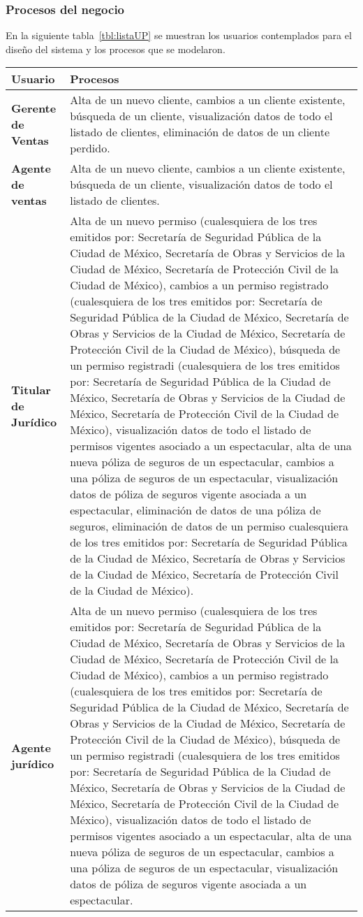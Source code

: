 \subsubsection{Procesos del negocio}
En la siguiente tabla~\ref{tbl:listaUP} se muestran los usuarios contemplados para el diseño del sistema y los procesos que se modelaron.
\begin{longtable}[H]{m{4cm}m{8cm}}
    \toprule
    \centering \textbf{Usuario} & \centering  \textbf{Procesos} \tabularnewline
    \midrule
    \textbf{Gerente de Ventas} & Alta de un nuevo cliente, cambios a un cliente existente, búsqueda de un cliente, visualización datos de todo el listado de clientes, eliminación de datos de un cliente perdido.\tabularnewline
    \textbf{Agente de ventas} & Alta de un nuevo cliente, cambios a un cliente existente, búsqueda de un cliente, visualización datos de todo el listado de clientes.\tabularnewline
    \textbf{Titular de Jurídico} & Alta de un nuevo permiso (cualesquiera de los tres emitidos por: Secretaría de Seguridad Pública de la Ciudad de México, Secretaría de Obras y Servicios de la Ciudad de México, Secretaría de Protección Civil de la Ciudad de México), cambios a un permiso registrado (cualesquiera de los tres emitidos por: Secretaría de Seguridad Pública de la Ciudad de México, Secretaría de Obras y Servicios de la Ciudad de México, Secretaría de Protección Civil de la Ciudad de México), búsqueda de un permiso registradi (cualesquiera de los tres emitidos por: Secretaría de Seguridad Pública de la Ciudad de México, Secretaría de Obras y Servicios de la Ciudad de México, Secretaría de Protección Civil de la Ciudad de México), visualización datos de todo el listado de permisos vigentes asociado a un espectacular, alta de una nueva póliza de seguros de un espectacular, cambios  a una póliza de seguros de un espectacular,  visualización datos de póliza de seguros vigente asociada a un espectacular, eliminación de datos de una póliza de seguros, eliminación de datos de un permiso cualesquiera de los tres emitidos por: Secretaría de Seguridad Pública de la Ciudad de México, Secretaría de Obras y Servicios de la Ciudad de México, Secretaría de Protección Civil de la Ciudad de México).\tabularnewline
    \textbf{Agente jurídico} & Alta de un nuevo permiso (cualesquiera de los tres emitidos por: Secretaría de Seguridad Pública de la Ciudad de México, Secretaría de Obras y Servicios de la Ciudad de México, Secretaría de Protección Civil de la Ciudad de México), cambios a un permiso registrado (cualesquiera de los tres emitidos por: Secretaría de Seguridad Pública de la Ciudad de México, Secretaría de Obras y Servicios de la Ciudad de México, Secretaría de Protección Civil de la Ciudad de México), búsqueda de un permiso registradi (cualesquiera de los tres emitidos por: Secretaría de Seguridad Pública de la Ciudad de México, Secretaría de Obras y Servicios de la Ciudad de México, Secretaría de Protección Civil de la Ciudad de México), visualización datos de todo el listado de permisos vigentes asociado a un espectacular, alta de una nueva póliza de seguros de un espectacular, cambios  a una póliza de seguros de un espectacular,  visualización datos de póliza de seguros vigente asociada a un espectacular.\tabularnewline

\end{longtable}
